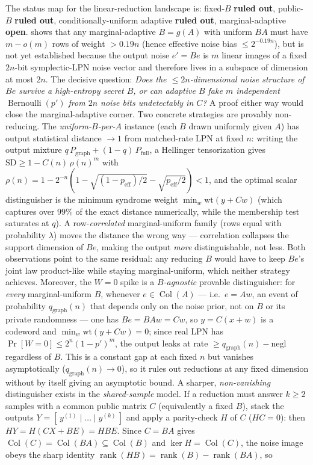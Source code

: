 \documentclass[11pt,a4paper]{article}
\theoremstyle{plain}
\theoremstyle{definition}
\begin{document}
\begin{enumerate}
The status map for the linear-reduction landscape is: fixed-$B$ \textbf{ruled out}, public-$B$ \textbf{ruled out}, conditionally-uniform adaptive \textbf{ruled out}, marginal-adaptive \textbf{open}.   shows that any marginal-adaptive $B=g(A)$ with uniform $BA$ must have $m-o(m)$ rows of weight $>0.19n$ (hence effective noise bias $\le 2^{-0.19n}$), but  is not yet established because the output noise $e'=Be$ is $m$ linear images of a fixed $2n$-bit symplectic-LPN noise vector and therefore lives in a subspace of dimension at most $2n$.  The decisive question: \emph{Does the $\le 2n$-dimensional noise structure of $Be$ survive a high-entropy secret $B$, or can adaptive $B$ fake $m$ independent $\operatorname{Bernoulli}(p')$ from $2n$ noise bits undetectably in $C$?}  A proof either way would close the marginal-adaptive corner. Two concrete strategies are provably non-reducing. The \emph{uniform-$B$-per-$A$} instance (each $B$ drawn uniformly given $A$) has output statistical distance $\to 1$ from matched-rate LPN at fixed $n$: writing the output mixture $q\,P_{\mathrm{graph}} + (1-q)\,P_{\mathrm{full}}$, a Hellinger tensorization gives $\mathrm{SD} \ge 1 - C(n)\,\rho(n)^m$ with $\rho(n) = 1 - 2^{-n}(1 - \sqrt{(1-p_{\mathrm{eff}})/2} - \sqrt{p_{\mathrm{eff}}/2}) < 1$, and the optimal scalar distinguisher is the minimum syndrome weight $\min_w \mathrm{wt}(y + Cw)$ (which captures over $99\%$ of the exact distance numerically, while the membership test saturates at $q$). A row-\emph{correlated} marginal-uniform family (rows equal with probability $\lambda$) moves the distance the wrong way --- correlation collapses the support dimension of $Be$, making the output \emph{more} distinguishable, not less. Both observations point to the same residual: any reducing $B$ would have to keep $Be$'s joint law product-like while staying marginal-uniform, which neither strategy achieves. Moreover, the $W=0$ spike is a \emph{$B$-agnostic} provable distinguisher: for \emph{every} marginal-uniform $B$, whenever $e \in \operatorname{Col}(A)$ --- i.e.\ $e = Aw$, an event of probability $q_{\mathrm{graph}}(n)$ that depends only on the noise prior, not on $B$ or its private randomness --- one has $Be = BAw = Cw$, so $y = C(x+w)$ is a codeword and $\min_w \mathrm{wt}(y+Cw) = 0$; since real LPN has $\Pr[W=0] \le 2^n(1-p')^m$, the output leaks at rate $\ge q_{\mathrm{graph}}(n) - \mathrm{negl}$ regardless of $B$. This is a constant gap at each fixed $n$ but vanishes asymptotically ($q_{\mathrm{graph}}(n) \to 0$), so it rules out reductions at any fixed dimension without by itself giving an asymptotic bound. A sharper, \emph{non-vanishing} distinguisher exists in the \emph{shared-sample} model. If a reduction must answer $k\ge 2$ samples with a common public matrix $C$ (equivalently a fixed $B$), stack the outputs $Y = [\,y^{(1)} \mid \dots \mid y^{(k)}\,]$ and apply a parity-check $H$ of $C$ ($HC=0$): then $HY = H(CX + BE) = HBE$. Since $C=BA$ gives $\operatorname{Col}(C)=\operatorname{Col}(BA)\subseteq\operatorname{Col}(B)$ and $\ker H=\operatorname{Col}(C)$, the noise image obeys the sharp identity $\operatorname{rank}(HB)=\operatorname{rank}(B)-\operatorname{rank}(BA)$, so

\end{enumerate}
\end{document}
